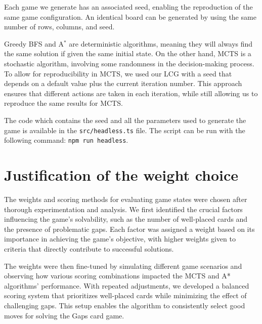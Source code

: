 Each game we generate has an associated seed, enabling the reproduction of the same game configuration. An identical board can be generated by using the same number of rows, columns, and seed.

Greedy BFS and A$^*$ are deterministic algorithms, meaning they will always find the same solution if given the same initial state. On the other hand, MCTS is a stochastic algorithm, involving some randomness in the decision-making process. To allow for reproducibility in MCTS, we used our LCG with a seed that depends on a default value plus the current iteration number. This approach ensures that different actions are taken in each iteration, while still allowing us to reproduce the same results for MCTS.

The code which contains the seed and all the parameters used to generate the game is available in the \texttt{src/headless.ts} file. The script can be run with the following command: \texttt{npm run headless}.

\section{Justification of the weight choice}
The weights and scoring methods for evaluating game states were chosen after thorough experimentation and analysis. We first identified the crucial factors influencing the game's solvability, such as the number of well-placed cards and the presence of problematic gaps. Each factor was assigned a weight based on its importance in achieving the game's objective, with higher weights given to criteria that directly contribute to successful solutions.

The weights were then fine-tuned by simulating different game scenarios and observing how various scoring combinations impacted the MCTS and A* algorithms' performance. With repeated adjustments, we developed a balanced scoring system that prioritizes well-placed cards while minimizing the effect of challenging gaps. This setup enables the algorithm to consistently select good moves for solving the Gaps card game.
